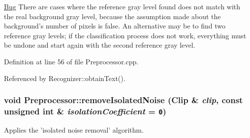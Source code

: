 \begin{Desc}
\item[\hyperlink{bug__bug000001}{Bug}]There are cases where the reference gray level found does not match with the real background gray level, because the assumption made about the background's number of pixels is false. An alternative may be to find two reference gray levels; if the classification process does not work, everything must be undone and start again with the second reference gray level. \end{Desc}


Definition at line 56 of file Preprocessor.cpp.

Referenced by Recognizer::obtainText().\hypertarget{class_preprocessor_a3e047486a0a80f2103f51d7141e41c5}{
\subsubsection[removeIsolatedNoise]{\setlength{\rightskip}{0pt plus 5cm}void Preprocessor::removeIsolatedNoise ({\bf Clip} \& {\em clip}, \/  const unsigned int \& {\em isolationCoefficient} = {\tt 0})}}
\label{class_preprocessor_a3e047486a0a80f2103f51d7141e41c5}


Applies the 'isolated noise removal' algorithm. 

